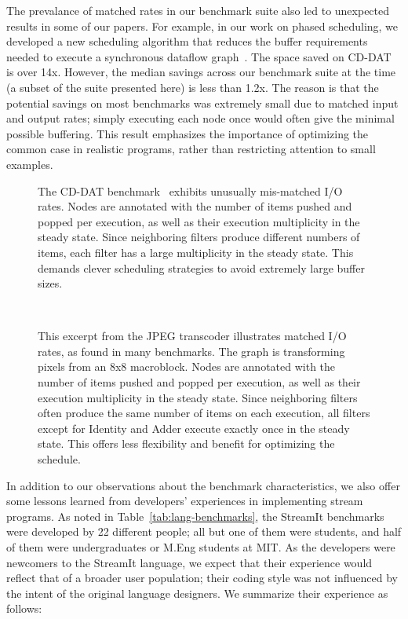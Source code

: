   The prevalance of matched rates in our benchmark suite also led to
  unexpected results in some of our papers.  For example, in our work
  on phased scheduling, we developed a new scheduling algorithm that
  reduces the buffer requirements needed to execute a synchronous
  dataflow graph~\cite{karczmarek-lctes03}.  The space saved on CD-DAT
  is over 14x.  However, the median savings across our benchmark suite
  at the time (a subset of the suite presented here) is less than
  1.2x.  The reason is that the potential savings on most benchmarks
  was extremely small due to matched input and output rates; simply
  executing each node once would often give the minimal possible
  buffering.  This result emphasizes the importance of optimizing the
  common case in realistic programs, rather than restricting attention
  to small examples.

\begin{figure}[t!]
\centering
{}
\vspace{-6pt}
\caption[CD-DAT, an example of mismatched I/O rates.]{The CD-DAT
  benchmark~\cite{murthy_buffer_2004} exhibits unusually mis-matched
  I/O rates.  Nodes are annotated with the number of items pushed and
  popped per execution, as well as their execution multiplicity in the
  steady state. Since neighboring filters produce different numbers of
  items, each filter has a large multiplicity in the steady state.
  This demands clever scheduling strategies to avoid extremely large
  buffer sizes.\protect\label{fig:cd-dat}}
~ \\
\vspace{-6pt}
\caption[JPEG transcoder excerpt, an example of matched I/O rates.]{This 
excerpt from the JPEG transcoder illustrates matched I/O rates, as
found in many benchmarks.  The graph is transforming pixels from an
8x8 macroblock.  Nodes are annotated with the number of items pushed
and popped per execution, as well as their execution multiplicity in
the steady state.  Since neighboring filters often produce the same
number of items on each execution, all filters except for Identity and
Adder execute exactly once in the steady state.  This offers less
flexibility and benefit for optimizing the
schedule.\protect\label{fig:jpeg}}
\vspace{-24pt}
\end{figure}

\myend

In addition to our observations about the benchmark characteristics,
we also offer some lessons learned from developers' experiences in
implementing stream programs.  As noted in
Table~\ref{tab:lang-benchmarks}, the StreamIt benchmarks were
developed by 22 different people; all but one of them were students,
and half of them were undergraduates or M.Eng students at MIT.  As the
developers were newcomers to the StreamIt language, we expect that
their experience would reflect that of a broader user population;
their coding style was not influenced by the intent of the original
language designers.  We summarize their experience as follows:

